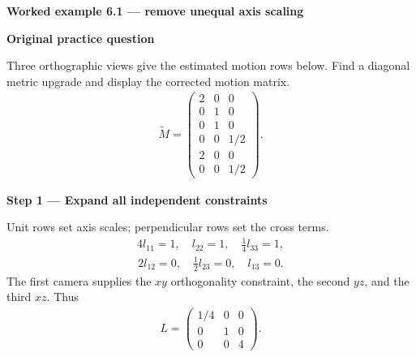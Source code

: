 \documentclass[letterpaper,11pt,english,openany,oneside]{jupyterBook}
\begin{document}
\begin{TextbookBox}
\textbf{Worked example 6.1 — remove unequal axis scaling}\par\smallskip

\par\medskip\textbf{Original practice question}\par\smallskip

\sphinxAtStartPar
Three orthographic views give the estimated motion rows below. Find a diagonal metric upgrade and display the corrected motion matrix.
\begin{equation*}
\begin{split}\widetilde M=\begin{pmatrix}2&0&0\\0&1&0\\0&1&0\\0&0&1/2\\2&0&0\\0&0&1/2\end{pmatrix}.\end{split}
\end{equation*}
\par\medskip

\par\medskip{}
{\color{QuizStepRed}\bfseries Step 1 — Expand all independent constraints}\par\smallskip

\sphinxAtStartPar
{} Unit rows set axis scales; perpendicular rows set the cross terms.
{\color{QuizMathBlue} \begin{equation*}
\begin{split}4l_{11}=1,\quad l_{22}=1,\quad \tfrac14l_{33}=1,\end{split}
\end{equation*}}{\color{QuizMathBlue} \begin{equation*}
\begin{split}2l_{12}=0,\quad \tfrac12l_{23}=0,\quad l_{13}=0.\end{split}
\end{equation*}}
\sphinxAtStartPar
The first camera supplies the {\color{QuizMathBlue} \(xy\)} orthogonality constraint, the second {\color{QuizMathBlue} \(yz\)}, and the third {\color{QuizMathBlue} \(xz\)}. Thus
{\color{QuizMathBlue} \begin{equation*}
\begin{split}L=\begin{pmatrix}1/4&0&0\\0&1&0\\0&0&4\end{pmatrix}.\end{split}
\end{equation*}}
\par


\end{TextbookBox}
\end{document}
